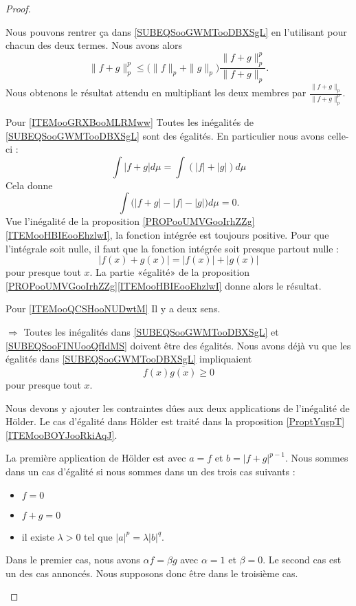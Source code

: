 \begin{proof}
\begin{subproof}
		Nous pouvons rentrer ça dans \eqref{SUBEQSooGWMTooDBXSgL} en l'utilisant pour chacun des deux termes. Nous avons alors
		\begin{equation}
			\| f+g \|_p^p\leq \big( \| f \|_p+\| g \|_p \big)\frac{ \| f+g \|_p^p }{ \| f+g \|_p }.
		\end{equation}
		Nous obtenons le résultat attendu en multipliant les deux membres par \( \frac{ \| f+g \|_p }{ \| f+g \|_p^p }\).
		\item[Pour \ref{ITEMooGRXBooMLRMww}]
		Toutes les inégalités de \eqref{SUBEQSooGWMTooDBXSgL} sont des égalités. En particulier nous avons celle-ci :
		\begin{equation}
			\int | f+g |d\mu=\int(| f |+| g |)d\mu
		\end{equation}
		Cela donne
		\begin{equation}
			\int\big( | f+g |-| f |-|g| \big)d\mu=0.
		\end{equation}
        Vue l'inégalité de la proposition \ref{PROPooUMVGooIrhZZg}\ref{ITEMooHBIEooEhzlwI}, la fonction intégrée est toujours positive. Pour que l'intégrale soit nulle, il faut que la fonction intégrée soit presque partout nulle :
		\begin{equation}
			| f(x)+g(x) |=| f(x) |+| g(x) |
		\end{equation}
        pour presque tout \( x\). La partie «égalité» de la proposition \ref{PROPooUMVGooIrhZZg}\ref{ITEMooHBIEooEhzlwI} donne alors le résultat.
		\item[Pour \ref{ITEMooQCSHooNUDwtM}]
		Il y a deux sens.
		\begin{subproof}
			\item[$ \Rightarrow$]
			Toutes les inégalités dans \eqref{SUBEQSooGWMTooDBXSgL} et \eqref{SUBEQSooFINUooQfIdMS} doivent être des égalités. Nous avons déjà vu que les égalités dans \eqref{SUBEQSooGWMTooDBXSgL} impliquaient
			\begin{equation}
				f(x)\overline{ g(x) }\geq 0
			\end{equation}
			pour presque tout \( x\).

			Nous devons y ajouter les contraintes dûes aux deux applications de l'inégalité de Hölder. Le cas d'égalité dans Hölder est traité dans la proposition \ref{ProptYqspT}\ref{ITEMooBOYJooRkiAqJ}.

			La première application de Hölder est avec \( a=f\) et \( b=| f+g |^{p-1}\). Nous sommes dans un cas d'égalité si nous sommes dans un des trois cas suivants :
			\begin{itemize}
				\item \( f=0\)
				\item \( f+g=0\)
				\item il existe \( \lambda>0\) tel que \( | a |^p=\lambda | b |^q\).
			\end{itemize}
			Dans le premier cas, nous avons \( \alpha f=\beta g\) avec \( \alpha=1\) et \( \beta=0\). Le second cas est un des cas annoncés. Nous supposons donc être dans le troisième cas.


\end{subproof}
\end{subproof}
\end{proof}
